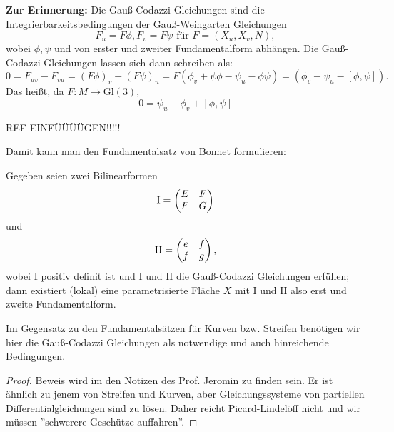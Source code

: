 \textbf{Zur Erinnerung:} Die Gauß-Codazzi-Gleichungen sind die Integrierbarkeitsbedingungen der Gauß-Weingarten Gleichungen
	\[F_u = F \phi, F_v = F \psi \text{ für } F = (X_u,X_v,N), \] wobei $ \phi,\psi $ und von erster und zweiter Fundamentalform abhängen. Die Gauß-Codazzi Gleichungen lassen sich dann schreiben als:
	\[ 0 = F_{uv}-F_{vu} = (F\phi)_v - (F\psi)_u = F(\phi_v + \psi\phi -\psi_u - \phi\psi ) = (\phi_v - \psi_u -[ \phi,\psi ]). \]
Das heißt, da $ F:M\rightarrow \mathrm{Gl}(3), $
	\begin{equation}
		0 = \psi_u - \phi_v + [\phi,\psi]
	\end{equation}
	
	{\color{ForestGreen} REF EINFÜÜÜÜGEN!!!!!}

Damit kann man den Fundamentalsatz von Bonnet formulieren:

\begin{theorem}
	Gegeben seien zwei Bilinearformen
		\[ \mathrm{I} = \begin{pmatrix} E & F \\ F & G \end{pmatrix} \] und 
		\[ \mathrm{II} = \begin{pmatrix} e & f \\ f & g \end{pmatrix}, \] wobei $ \mathrm{I} $ positiv definit ist und $ \mathrm{I} $ und $ \mathrm{II} $ die Gauß-Codazzi Gleichungen erfüllen; dann existiert (lokal) eine parametrisierte Fläche $ X $ mit $\mathrm{I}$ und $\mathrm{II}$ also erst und zweite Fundamentalform.
	
\end{theorem}

\begin{remark}
	Im Gegensatz zu den Fundamentalsätzen für Kurven bzw. Streifen benötigen wir hier die Gauß-Codazzi Gleichungen als notwendige und auch hinreichende Bedingungen.
\end{remark}

\begin{proof}
	Beweis wird im den Notizen des Prof. Jeromin zu finden sein.
	Er ist ähnlich zu jenem von Streifen und Kurven, aber Gleichungssysteme von partiellen Differentialgleichungen sind zu lösen. Daher reicht Picard-Lindelöff nicht und wir müssen ''schwerere Geschütze auffahren''.
\end{proof}


